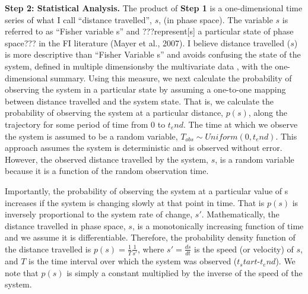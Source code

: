 \documentclass[12pt,twoside,openany]{reedthesis}
\begin{document}
\textbf{Step 2: Statistical Analysis.} The product of \textbf{Step 1} is a one-dimensional time series of what I call ``distance travelled'', \(s\), (in phase space). The variable \(s\) is referred to as ``Fisher variable s'' and ???represent{[}s{]} a particular state of phase space??? in the FI literature (Mayer et al., 2007). I believe distance travelled (\(s\)) is more descriptive than ``Fisher Variable s'' and avoids confusing the state of the system, defined in multiple dimensionsby the multivariate data , with the one-dimensional summary. Using this measure, we next calculate the probability of observing the system in a particular state by assuming a one-to-one mapping between distance travelled and the system state. That is, we calculate the probability of observing the system at a particular distance, \(p(s)\), along the trajectory for some period of time from 0 to \(t_end\). The time at which we observe the system is assumed to be a random variable, \(T_{obs} \sim Uniform(0,t_end)\). This approach assumes the system is deterministic and is observed without error. However, the observed distance travelled by the system, \(s\), is a random variable because it is a function of the random observation time.

Importantly, the probability of observing the system at a particular value of s increases if the system is changing slowly at that point in time. That is \(p(s)\) is inversely proportional to the system rate of change, \(s'\). Mathematically, the distance travelled in phase space, \(s\), is a monotonically increasing function of time and we assume it is differentiable. Therefore, the probability density function of the distance travelled is \(p(s)=\frac{1}{T}\frac{1}{s'}\), where \(s'=\frac{ds}{dt}\) is the speed (or velocity) of \(s\), and \(T\) is the time interval over which the system was observed (\(t_start\)-\(t_end\)). We note that \(p(s)\) is simply a constant multiplied by the inverse of the speed of the system.
\end{document}
